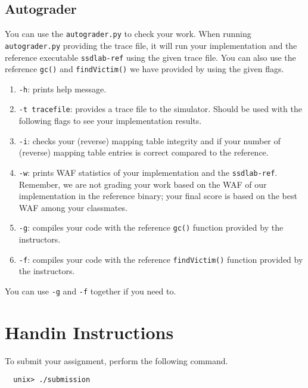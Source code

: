 \documentclass[11pt]{article}
\begin{document}
\subsection{Autograder}
\label{sec:autograder}

You can use the \texttt{autograder.py} to check your work. 
When running \texttt{autograder.py} providing the trace file, it will run your implementation and the reference executable \texttt{ssdlab-ref} using the given trace file. 
You can also use the reference \texttt{gc()} and \texttt{findVictim()} we have provided by using the given flags.

\begin{enumerate}
    \item \texttt{-h}: prints help message.
    \item \texttt{-t tracefile}: provides a trace file to the simulator. Should be used with the following flags to see your implementation results.
    \item \texttt{-i}: checks your (reverse) mapping table integrity and if your number of (reverse) mapping table entries is correct compared to the reference.
    \item \texttt{-w}: prints WAF statistics of your implementation and the \texttt{ssdlab-ref}. Remember, we are not grading your work based on the WAF of our implementation in the reference binary; your final score is based on the best WAF among your classmates.
    \item \texttt{-g}: compiles your code with the reference \texttt{gc()} function provided by the instructors.
    \item \texttt{-f}: compiles your code with the reference \texttt{findVictim()} function provided by the instructors.
\end{enumerate}

You can use \texttt{-g} and \texttt{-f} together if you need to.



\section{Handin Instructions}


To submit your assignment, perform the following command.
\begin{verbatim}
  unix> ./submission
\end{verbatim}
\end{document}
